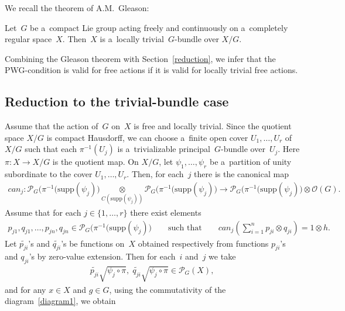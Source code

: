 We recall the theorem of A.M.~Gleason:
\begin{theorem}[\cite{g-am50}] Let~$G$ be a~compact Lie group acting freely and continuously on a~completely regular space~$X$.
Then~$X$ is a~locally trivial~$G$-bundle over $X/G$.
\end{theorem}

Combining the Gleason theorem with Section~\ref{reduction}, we infer that the PWG-condition is valid for free actions if it
is valid for locally trivial free actions.

\subsection{Reduction to the trivial-bundle case}\label{tbundle}

Assume that the action of~$G$ on~$X$ is free and locally trivial.
Since the quotient space $X/G$ is compact Hausdorf\/f, we can choose a~f\/inite open cover $U_1,\ldots,U_r$ of $X/G$ such
that each $\pi^{-1}(U_j)$ is a~trivializable principal~$G$-bundle over~$U_j$.
Here $\pi\colon X\to X/G$ is the quotient map.
On $X/G$, let $\psi_1,\ldots,\psi_r$ be a~partition of unity subordinate to the cover $U_1,\ldots,U_r$.
Then, for each~$j$ there is the canonical map
\begin{gather*}
{can}_j\colon \mathcal{P}_G\big(\pi^{-1}(\mathrm{supp}(\psi_j)\big)\underset{C(\mathrm{supp}(\psi_j))} {\otimes}
\mathcal{P}_G\big(\pi^{-1}(\mathrm{supp}(\psi_j)\big) \longrightarrow
\mathcal{P}_G\big(\pi^{-1}(\mathrm{supp}(\psi_j)\big)\otimes{\mathcal O}(G).
\end{gather*}
Assume that for each $j\in\{1,\ldots,r\}$ there exist elements
\begin{gather*}
p_{j1},q_{j1},\ldots,p_{jn},q_{jn}\in \mathcal{P}_G\big(\pi^{-1}(\mathrm{supp}(\psi_j)\big)
\qquad
\text{such that}
\qquad
{can}_j\left(\sum\limits_{i=1}^n p_{ji}\otimes q_{ji}\right)=1\otimes h.
\end{gather*}
Let $\widetilde{p_{ji}}$'s and $\widetilde{q_{ji}}$'s be functions on~$X$ obtained respectively from functions
$p_{ji}$'s and $q_{ji}$'s by zero-value extension.
Then for each~$i$ and~$j$ we take
\begin{gather*}
\widetilde{p_{ji}}\sqrt{\psi_j\circ\pi},\; \widetilde{q_{ji}}\sqrt{\psi_j\circ\pi}
\in\mathcal{P}_G(X),
\end{gather*}
and for any $x\in X$ and $g\in G$, using the commutativity of the diagram~\eqref{diagram1}, we obtain
